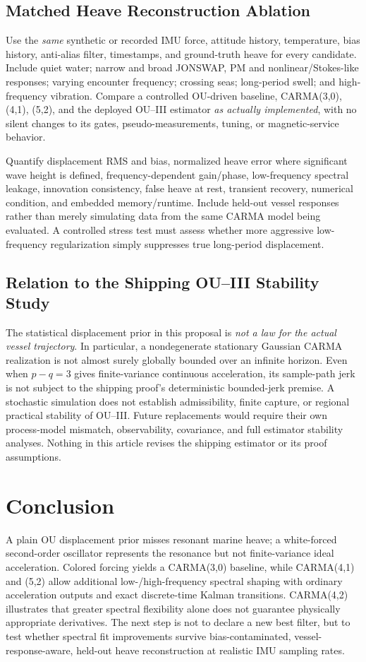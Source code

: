 \documentclass[10pt,journal]{IEEEtran}
\begin{document}
\subsection{Matched Heave Reconstruction Ablation}
Use the \emph{same} synthetic or recorded IMU force,
attitude history, temperature, bias history, anti-alias
filter, timestamps, and ground-truth heave for every
candidate. Include quiet water; narrow and broad JONSWAP,
PM and nonlinear/Stokes-like responses; varying encounter
frequency; crossing seas; long-period swell; and
high-frequency vibration. Compare a controlled OU-driven
baseline, CARMA(3,0), (4,1), (5,2), and the deployed
OU--III estimator \emph{as actually implemented}, with no
silent changes to its gates, pseudo-measurements, tuning,
or magnetic-service behavior.

Quantify displacement RMS and bias, normalized heave
error where significant wave height is defined,
frequency-dependent gain/phase, low-frequency spectral
leakage, innovation consistency, false heave at rest,
transient recovery, numerical condition, and embedded
memory/runtime. Include held-out vessel responses rather
than merely simulating data from the same CARMA model
being evaluated. A controlled stress test must assess
whether more aggressive low-frequency regularization
simply suppresses true long-period displacement.

\subsection{Relation to the Shipping OU--III Stability Study}
The statistical displacement prior in this proposal is
\emph{not a law for the actual vessel trajectory}.
In particular, a nondegenerate stationary Gaussian
CARMA realization is not almost surely globally bounded
over an infinite horizon. Even when \(p-q=3\) gives
finite-variance continuous acceleration, its sample-path
jerk is not subject to the shipping proof's deterministic
bounded-jerk premise. A stochastic simulation does not
establish admissibility, finite capture, or regional
practical stability of OU--III. Future replacements would
require their own process-model mismatch, observability,
covariance, and full estimator stability analyses.
Nothing in this article revises the shipping estimator
or its proof assumptions.

\section{Conclusion}
A plain OU displacement prior misses resonant marine
heave; a white-forced second-order oscillator represents
the resonance but not finite-variance ideal acceleration.
Colored forcing yields a CARMA(3,0) baseline, while
CARMA(4,1) and (5,2) allow additional low-/high-frequency
spectral shaping with ordinary acceleration outputs and
exact discrete-time Kalman transitions. CARMA(4,2)
illustrates that greater spectral flexibility alone
does not guarantee physically appropriate derivatives.
The next step is not to declare a new best filter, but
to test whether spectral fit improvements survive
bias-contaminated, vessel-response-aware, held-out
heave reconstruction at realistic IMU sampling rates.
\end{document}
